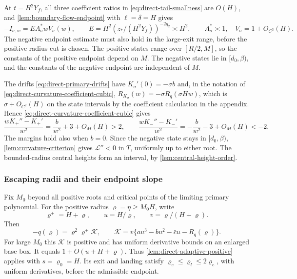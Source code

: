 At \(t=H^2Y_f\), all three coefficient ratios in
\eqref{eq:direct-tail-smallness} are \(O(H)\), and
\cref{lem:boundary-flow-endpoint} with \(\ell=\delta=H\) gives
\begin{equation}
\label{eq:direct-primary-endpoints}
 -I_{\sigma,w}=E A_\sigma^*wV_\sigma(w),\qquad
 E=H^2(z_*/(H^2Y_f))^{-2q_2}\asymp H^2,\qquad
 A_\sigma^*\asymp1,\quad V_\sigma=1+O_{C^3}(H).
\end{equation}
The negative endpoint estimate must also hold in the large-exit range,
before the positive radius cut is chosen.
The positive states range over \([R/2,M]\), so the constants of the
positive endpoint depend on \(M\). The negative states lie in
\([d_0,\beta)\), and the constants of the negative endpoint are
independent of \(M\).

The drifts \eqref{eq:direct-primary-drifts} have
\(K_\sigma'(0)=-\sigma b\) and, in the notation of
\eqref{eq:direct-curvature-coefficient-cubic},
\(R_{K_\sigma}(w)=-\sigma R_q(\sigma Hw)\), which is
\(\sigma+O_{C^2}(H)\) on the state intervals by the coefficient
calculation in the appendix. Hence
\eqref{eq:direct-curvature-coefficient-cubic} gives
\begin{equation}
\label{eq:direct-primary-opposite-curvatures}
 \frac{wK_+''-K_+'}{w^2}=\frac b{w^2}+3+O_M(H)>2,\qquad
 \frac{wK_-''-K_-'}{w^2}=-\frac b{w^2}-3+O_M(H)<-2 .
\end{equation}
The margins hold also when \(b=0\). Since the negative state stays in
\([d_0,\beta)\), \cref{lem:curvature-criterion} gives \(\mathcal L''<0\)
in \(T\), uniformly up to either root. The bounded-radius central
heights form an interval, by \cref{lem:central-height-order}.

\subsubsection{Escaping radii and their endpoint slope}

Fix \(M_0\) beyond all positive roots and critical points of
the limiting primary polynomial. For the positive radius
\(\varrho=\eta\ge M_0H\), write
\[
 \varrho^+=H+\varrho,\qquad u=H/\varrho,\qquad
 v=\varrho/(H+\varrho).
\]
Then
\[
 -q(\varrho)=\varrho^2\varrho^+\mathcal K,\qquad
 \mathcal K=v\{au^3-bu^2-\bar c u-R_q(\varrho)\}.
\]
For large \(M_0\) this \(\mathcal K\) is positive and has
uniform derivative bounds on an enlarged base box.
It equals \(1+O(u+H+\varrho)\). Thus
\cref{lem:direct-adaptive-positive} applies with \(s=\varrho_0=H\).
Its exit and landing satisfy
\(\varrho_e\le\varrho_l\le2\varrho_e\), with uniform derivatives,
before the admissible endpoint.

